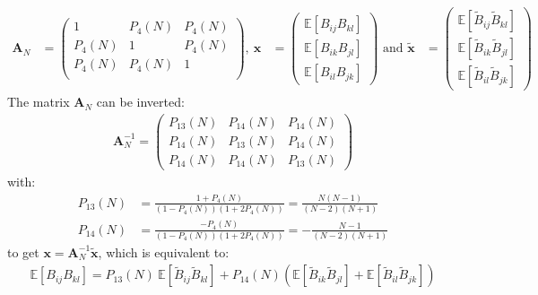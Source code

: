\documentclass[12pt]{scrartcl}
\begin{document}
\begin{align}
\mathbf{A}_N & = \left( \begin{array}{ccc}
1 & P_4(N) & P_4(N) \\
P_4(N) & 1 & P_4(N) \\
P_4(N) & P_4(N) & 1 \\
\end{array} \right) , \
\mathbf{x} & = \left( \begin{array}{c}
\mathbb{E} \left[B_{ij} B_{kl}\right] \\
\mathbb{E} \left[B_{ik} B_{jl}\right] \\
\mathbb{E} \left[B_{il} B_{jk}\right]
\end{array} \right) \text{ and }
\widetilde{\mathbf{x}} & = \left( \begin{array}{c}
\mathbb{E} \left[\widetilde{B}_{ij} \widetilde{B}_{kl}\right] \\
\mathbb{E} \left[\widetilde{B}_{ik} \widetilde{B}_{jl}\right] \\
\mathbb{E} \left[\widetilde{B}_{il} \widetilde{B}_{jk}\right]
\end{array} \right) \nonumber
\end{align}
The matrix $\mathbf{A}_N$ can be inverted:
\begin{align}
\label{eq:invert_lin_sys_gau}
\mathbf{A}_N^{-1} = \left( \begin{array}{ccc}
P_{13}(N) & P_{14}(N) & P_{14}(N) \\
P_{14}(N) & P_{13}(N) & P_{14}(N) \\
P_{14}(N) & P_{14}(N) & P_{13}(N)
\end{array} \right)
\end{align}
with:
\begin{subequations}
\begin{align}
P_{13}(N) & = \frac{1 + P_4(N)}{\left(1 - P_4(N)\right)\left(1 + 2P_4(N)\right)} = \frac{N(N-1)}{(N-2)(N+1)} \\
P_{14}(N) & = \frac{-P_4(N)}{\left(1 - P_4(N)\right)\left(1 + 2P_4(N)\right)} = -\frac{N-1}{(N-2)(N+1)}
\end{align}
\end{subequations}
to get $\mathbf{x} = \mathbf{A}_N^{-1} \widetilde{\mathbf{x}}$, which is equivalent to:
\begin{align}
\label{eq:prod_asy_cov_gau}
\mathbb{E} \left[B_{ij} B_{kl}\right] = P_{13}(N) \ \mathbb{E} \left[\widetilde{B}_{ij} \widetilde{B}_{kl}\right] + P_{14}(N) \left(\mathbb{E} \left[\widetilde{B}_{ik} \widetilde{B}_{jl}\right] + \mathbb{E} \left[\widetilde{B}_{il} \widetilde{B}_{jk}\right]\right)
\end{align}
\end{document}

